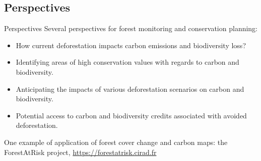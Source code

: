 \documentclass[10pt,table,dvipsnames,compress]{beamer}
\begin{document}
\subsection{Perspectives}
\label{sec:org8cb981b}

\begin{frame}[label={sec:org13464de}]{Perspectives}
Several perspectives for forest monitoring and conservation planning:
\begin{itemize}
\item How current deforestation impacts carbon emissions and biodiversity loss?
\item Identifying areas of high conservation values with regards to carbon and biodiversity.
\item Anticipating the impacts of various deforestation scenarios on carbon and biodiversity.
\item Potential access to carbon and biodiversity credits associated with avoided deforestation.
\end{itemize}

\vspace{0.20cm}
One example of application of forest cover change and carbon maps: the ForestAtRisk project, \url{https://forestatrisk.cirad.fr}
\end{frame}

\end{document}
